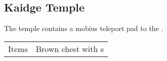 \subsection{Kaidge Temple}
\label{map:kaidge_temple}

The temple contains a mobius teleport pad to the .


\noindent\begin{tabularx}{\textwidth}[l]{lX}
	Items & Brown chest with \nameref{item:cure_potion}s
\end{tabularx}
